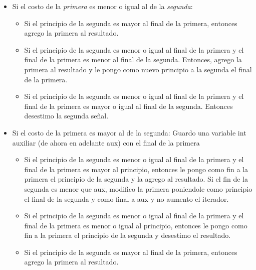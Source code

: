 \begin{itemize}
	\item Si el costo de la \textit{primera} es menor o igual al de la \textit{segunda}:
        \begin{itemize}
            \item Si el principio de la segunda es mayor al final de la primera, entonces agrego la primera al resultado.
            \item Si el principio de la segunda es menor o igual al final de la primera y el final de la primera es menor al final de la segunda. Entonces, agrego la primera al resultado y le pongo como nuevo principio a la segunda el final de la primera.
            \item Si el principio de la segunda es menor o igual al final de la primera y el final de la primera es mayor o igual al final de la segunda. Entonces desestimo la segunda señal.
        \end{itemize}

	\item Si el costo de la primera es mayor al de la segunda:
Guardo una variable int auxiliar (de ahora en adelante aux) con el final de la primera
        \begin{itemize}
            \item Si el principio de la segunda es menor o igual al final de la primera y el final de la primera es mayor al principio, entonces le pongo como fin a la primera el principio de la segunda y la agrego al resultado. Si el fin de la segunda es menor que aux, modifico la primera poniendole como principio el final de la segunda y como final a aux y no aumento el iterador.
            \item Si el principio de la segunda es menor o igual al final de la primera y el final de la primera es menor o igual al principio, entonces le pongo como fin a la primera el principio de la segunda y desestimo el resultado.
            \item Si el principio de la segunda es mayor al final de la primera, entonces agrego la primera al resultado.
        \end{itemize}
\end{itemize}




